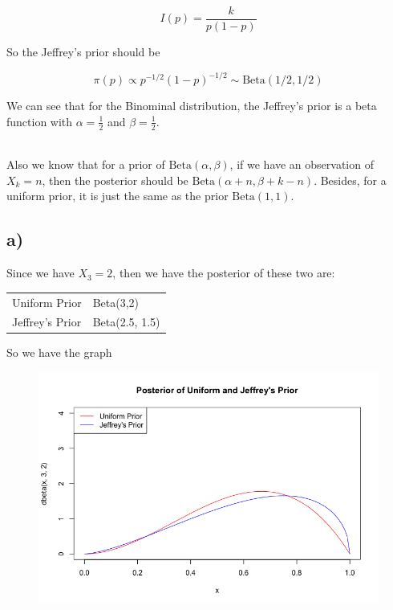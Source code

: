 \documentclass[12pt]{article}
\begin{document}
\begin{flushleft}
$$
I(p) = \frac{k}{p(1-p)}
$$

\qquad So the Jeffrey's prior should be 

$$
\pi(p) \propto p^{-1/2}(1-p)^{-1/2} \sim \text{Beta}(1/2, 1/2)
$$

\qquad We can see that for the Binominal distribution, the Jeffrey's prior is a beta function with $\alpha  = \frac{1}{2}$ and $\beta = \frac{1}{2}$.

~\\

\qquad Also we know that for a prior of $\text{Beta}(\alpha, \beta)$, if we have an observation of $X_k = n$, then the posterior should be $\text{Beta}(\alpha + n, \beta + k - n)$. Besides, for a uniform prior, it is just the same as the prior $\text{Beta}(1,1)$.

\newpage

\subsection*{a)}

\qquad Since we have $X_3 = 2$, then we have the posterior of these two are:

\vspace{-0.2cm}

\begin{table}[h]
\centering
\begin{tabular}{ll}
Uniform Prior & Beta(3,2)\\
Jeffrey's Prior & Beta(2.5, 1.5)
\end{tabular}
\end{table}

\qquad So we have the graph

\begin{figure}[h]
\centering
\includegraphics[width = 0.7\linewidth]{q3_1.png}
\end{figure}


\end{flushleft}
\end{document}
